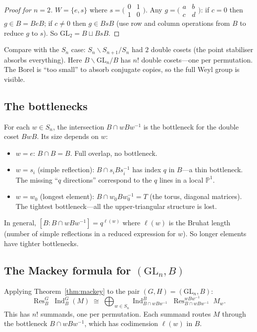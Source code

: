 \documentclass[12pt,a4paper]{article}
\theoremstyle{definition}
\theoremstyle{remark}
\newcommand{\Ind}{\operatorname{Ind}}
\newcommand{\Res}{\operatorname{Res}}
\newcommand{\GL}{\mathrm{GL}}
\begin{document}
\begin{proof}[Proof for $n = 2$]
$W = \{e, s\}$ where
$s = \bigl(\begin{smallmatrix} 0 & 1 \\ 1 & 0 \end{smallmatrix}\bigr)$.
Any $g = \bigl(\begin{smallmatrix} a & b \\ c & d \end{smallmatrix}\bigr)$:
if $c = 0$ then $g \in B = BeB$; if $c \neq 0$ then $g \in BsB$
(use row and column operations from $B$ to reduce $g$ to $s$). So
$\GL_2 = B \sqcup BsB$.
\end{proof}

Compare with the $S_n$ case: $S_n \backslash S_{n+1} / S_n$ had
$2$ double cosets (the point stabiliser absorbs everything). Here
$B \backslash \GL_n / B$ has $n!$ double cosets---one per permutation.
The Borel is ``too small'' to absorb conjugate copies, so the full
Weyl group is visible.

\subsection{The bottlenecks}

For each $w \in S_n$, the intersection $B \cap wBw^{-1}$ is the
bottleneck for the double coset $BwB$. Its size depends on $w$:
\begin{itemize}
\item $w = e$: $B \cap B = B$. Full overlap, no bottleneck.
\item $w = s_i$ (simple reflection): $B \cap s_i B s_i^{-1}$ has
  index $q$ in $B$---a thin bottleneck. The missing ``$q$ directions''
  correspond to the $q$ lines in a local $\mathbb{P}^1$.
\item $w = w_0$ (longest element): $B \cap w_0 B w_0^{-1} = T$
  (the torus, diagonal matrices). The tightest bottleneck---all the
  upper-triangular structure is lost.
\end{itemize}

In general, $[B : B \cap wBw^{-1}] = q^{\ell(w)}$ where $\ell(w)$ is
the Bruhat length (number of simple reflections in a reduced
expression for $w$). So longer elements have tighter bottlenecks.

\subsection{The Mackey formula for $(\GL_n, B)$}

Applying Theorem~\ref{thm:mackey} to the pair $(G, H) = (\GL_n, B)$:
\begin{equation}\label{eq:mackey-GLn-B}
  \Res_B^G\;\Ind_B^G(M)
  \;\cong\;
  \bigoplus_{w \in S_n}
  \Ind_{B \cap wBw^{-1}}^{B}\;
  \Res_{B \cap wBw^{-1}}^{wBw^{-1}}\; M_w.
\end{equation}
This has $n!$ summands, one per permutation. Each summand routes $M$
through the bottleneck $B \cap wBw^{-1}$, which has codimension
$\ell(w)$ in $B$.
\end{document}
